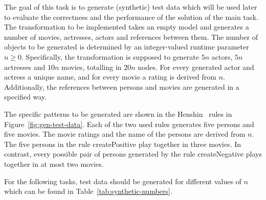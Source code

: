 \documentclass[a4paper,11pt]{article}
\begin{document}

The goal of this task is to generate (synthetic) test data which will be used
later to evaluate the correctness and the performance of the solution of the 
main task. The transformation to be implemented takes an empty model and 
generates a number of movies, actresses, actors and references between them.
The number of objects to be generated is determined by an integer-valued 
runtime parameter $n\geq0$. Specifically, the transformation is supposed
to generate $5n$ actors, $5n$ actresses and $10n$ movies, totalling in 
$20n$ nodes. For every generated actor and actress a unique name, and for 
every movie a rating is derived from $n$. Additionally, the references between
persons and movies are generated in a specified way.

The specific patterns to be generated are shown in the Henshin~\cite{ABJ+10} rules in
Figure~\ref{fig:gen-test-data}. Each of the two used rules generates five
persons and five movies. The movie ratings and the name of the persons are
derived from $n$. The five persons in the rule \textsf{createPositive} play
together in three movies. In contrast,
every possible pair of persons generated by the rule \textsf{createNegative}
plays together in at most two movies.

For the following tasks, test data should be generated for different values 
of $n$ which can be found in Table~\ref{tab:synthetic-numbers}.
\end{document}

